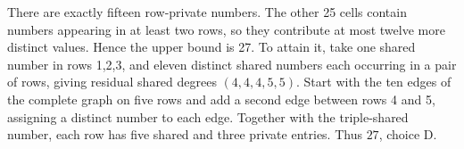 There are exactly fifteen row-private numbers. The other 25 cells contain numbers appearing in at least two rows, so they contribute at most twelve more distinct values. Hence the upper bound is 27. To attain it, take one shared number in rows 1,2,3, and eleven distinct shared numbers each occurring in a pair of rows, giving residual shared degrees $(4,4,4,5,5)$. Start with the ten edges of the complete graph on five rows and add a second edge between rows 4 and 5, assigning a distinct number to each edge. Together with the triple-shared number, each row has five shared and three private entries. Thus $\boxed{27}$, choice D.
